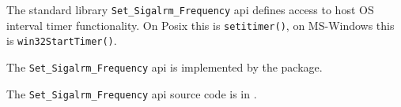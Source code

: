 
The standard library {\tt Set\_Sigalrm\_Frequency} api defines access to host 
OS interval timer functionality.  On Posix this is {\tt setitimer()}, 
on MS-Windows this is {\tt win32StartTimer()}.

The {\tt Set\_Sigalrm\_Frequency} api is implemented by the 
 package.

The {\tt Set\_Sigalrm\_Frequency} api source code is in .







